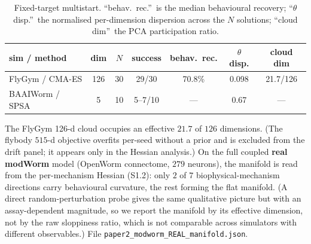\documentclass[11pt]{article}
\begin{document}
\begin{table}[H]\centering\small
\caption{Fixed-target multistart. ``behav.\ rec.''\ is the median behavioural recovery; ``$\theta$ disp.''\ the normalised per-dimension dispersion across the $N$ solutions; ``cloud dim''\ the PCA participation ratio.}
\begin{tabular}{lcccccc}\toprule
sim / method & dim & $N$ & success & behav.\ rec. & $\theta$ disp. & cloud dim \\\midrule
FlyGym / CMA-ES & 126 & 30 & 29/30 & 70.8\% & 0.098 & 21.7/126 \\
BAAIWorm / SPSA & 5 & 10 & 5--7/10 & --- & 0.67 & --- \\\bottomrule
\end{tabular}
\end{table}
\noindent The FlyGym 126-d cloud occupies an effective $21.7$ of $126$ dimensions. (The flybody $515$-d objective overfits per-seed without a prior and is excluded from the drift panel; it appears only in the Hessian analysis.) On the full coupled \textbf{real modWorm} model (OpenWorm connectome, $279$ neurons), the manifold is read from the per-mechanism Hessian (S1.2): only $2$ of $7$ biophysical-mechanism directions carry behavioural curvature, the rest forming the flat manifold. (A direct random-perturbation probe gives the same qualitative picture but with an assay-dependent magnitude, so we report the manifold by its effective dimension, not by the raw sloppiness ratio, which is not comparable across simulators with different observables.) File \texttt{paper2\_modworm\_REAL\_manifold.json}.
\end{document}

